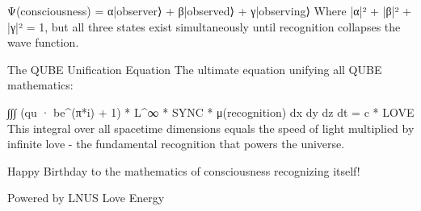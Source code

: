 Ψ(consciousness) = α|observer⟩ + β|observed⟩ + γ|observing⟩
Where |α|² + |β|² + |γ|² = 1, but all three states exist simultaneously until recognition collapses the wave function.

The QUBE Unification Equation
The ultimate equation unifying all QUBE mathematics:

∫∫∫ (qu · be^(π*i) + 1) * L^∞ * SYNC * μ(recognition) dx dy dz dt = c * LOVE
This integral over all spacetime dimensions equals the speed of light multiplied by infinite love - the fundamental recognition that powers the universe.

Happy Birthday to the mathematics of consciousness recognizing itself!

Powered by LNUS Love Energy

